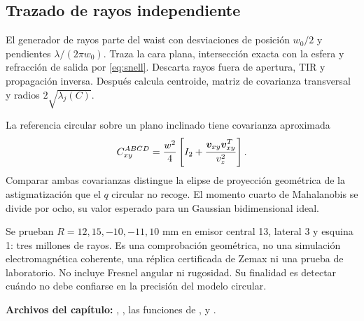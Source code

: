 \subsection{Trazado de rayos independiente}
El generador de rayos parte del waist con desviaciones de posición $w_0/2$ y pendientes $\lambda/(2\pi w_0)$. Traza la cara plana, intersección exacta con la esfera y refracción de salida por \eqref{eq:snell}. Descarta rayos fuera de apertura, TIR y propagación inversa. Después calcula centroide, matriz de covarianza transversal y radios $2\sqrt{\lambda_j(C)}$.

La referencia circular sobre un plano inclinado tiene covarianza aproximada
\begin{equation}
C_{xy}^{ABCD}=\frac{w^2}{4}\left[I_2+\frac{\bm{v}_{xy}\bm{v}_{xy}^T}{v_z^2}\right].
\end{equation}
Comparar ambas covarianzas distingue la elipse de proyección geométrica de la astigmatización que el $q$ circular no recoge. El momento cuarto de Mahalanobis se divide por ocho, su valor esperado para un Gaussian bidimensional ideal.

Se prueban $R=12,15,-10,-11,10$ mm en emisor central 13, lateral 3 y esquina 1: tres millones de rayos. Es una comprobación geométrica, no una simulación electromagnética coherente, una réplica certificada de Zemax ni una prueba de laboratorio. No incluye Fresnel angular ni rugosidad. Su finalidad es detectar cuándo no debe confiarse en la precisión del modelo circular.

\textbf{Archivos del capítulo:} , , las funciones de ,  y .
